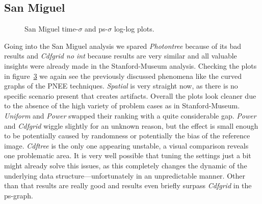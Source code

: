 \FloatBarrier
\subsection{San Miguel}

\begin{figure}
    \centering
    \begin{subfigure}{.5\textwidth}
      \centering
        \caption{}
        \label{fig:sanmain_t}
    \end{subfigure}%
    \begin{subfigure}{.5\textwidth}
        \caption{}
        \label{fig:sanmain_ps}
    \end{subfigure}
    \caption{San Miguel time-$\sigma$ and ps-$\sigma$ log-log plots.}
    \label{fig:sanmain}
\end{figure}

Going into the San Miguel analysis we spared \textit{Photontree} because of its bad results and \textit{Cdfgrid no int} because results are very similar and all valuable insights were already made in the Stanford-Museum analysis. Checking the plots in figure~\ref{fig:sanmain} we again see the previously discussed phenomena like the curved graphs of the PNEE techniques. \textit{Spatial} is very straight now, as there is no specific scenario present that creates artifacts. Overall the plots look cleaner due to the absence of the high variety of problem cases as in Stanford-Museum. \textit{Uniform} and \textit{Power} swapped their ranking with a quite considerable gap. \textit{Power} and \textit{Cdfgrid} wiggle slightly for an unknown reason, but the effect is small enough to be potentially caused by randomness or potentially the bias of the reference image. \textit{Cdftree} is the only one appearing unstable, a visual comparison reveals one problematic area. It is very well possible that tuning the settings just a bit might already solve this issues, as this completely changes the dynamic of the underlying data structure---unfortunately in an unpredictable manner. Other than that results are really good and results even briefly surpass \textit{Cdfgrid} in the ps-graph. 

